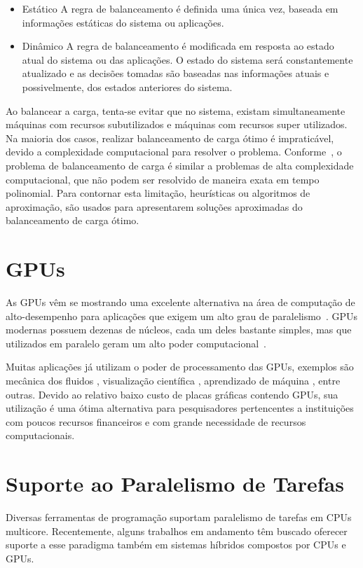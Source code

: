 \begin{itemize}
\item Estático A regra de balanceamento é definida uma única vez, baseada em informações estáticas do sistema ou aplicações.

\item Dinâmico A regra de balanceamento é modificada em resposta ao estado atual do sistema ou das aplicações. O estado do sistema será constantemente atualizado e as decisões tomadas são baseadas nas informações atuais e possivelmente, dos estados anteriores do sistema.
\end{itemize}

Ao balancear a carga, tenta-se evitar que no sistema, existam simultaneamente máquinas com recursos subutilizados e máquinas com recursos super utilizados. Na maioria dos casos, realizar balanceamento de carga ótimo é impraticável, devido a complexidade computacional para resolver o problema. Conforme~\cite{virtual}, o problema de balanceamento de carga  é similar a problemas de alta complexidade computacional, que não podem ser resolvido de maneira exata em tempo polinomial. Para contornar esta limitação, heurísticas ou algoritmos de aproximação, são usados para apresentarem soluções aproximadas do balanceamento de carga ótimo.

\section{GPUs}\label{intro:historico}

As GPUs vêm se mostrando uma excelente alternativa na área de computação de alto-desempenho para aplicações que exigem um alto grau de paralelismo~\cite{gpu}. GPUs modernas possuem dezenas de núcleos, cada um deles bastante simples, mas que utilizados em paralelo geram um alto poder computacional~\cite{cuda}.

Muitas aplicações já utilizam o poder de processamento das GPUs, exemplos são mecânica dos fluidos \cite{fluido}, visualização científica \cite{visualizacao},  aprendizado de máquina \cite{Aprendizado}, entre outras. Devido ao relativo baixo custo de placas gráficas contendo GPUs, sua utilização é uma ótima alternativa para pesquisadores pertencentes a instituições com poucos recursos financeiros e com grande necessidade de recursos computacionais.


\section{Suporte ao Paralelismo de Tarefas}
Diversas ferramentas de programação suportam paralelismo de tarefas em CPUs multicore. Recentemente, alguns trabalhos em andamento têm buscado oferecer suporte a esse paradigma também em sistemas híbridos compostos por CPUs e GPUs.


